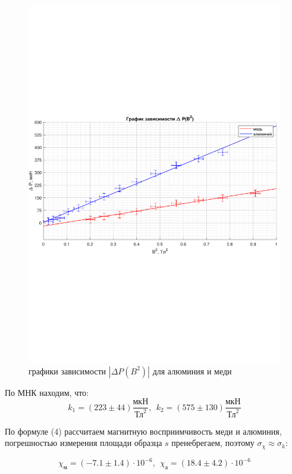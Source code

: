 \documentclass[a4paper,14pt]{article}
\begin{document}
\begin{center}
	\begin{figure}[bhtp]
		\centering
		\includegraphics[width=1.05\linewidth]{gr2.pdf}
		\caption{графики зависимости $|\Delta P(B^2)|$ для алюминия и меди}\label{gra2}
	\end{figure}
\end{center}

По МНК находим, что: \[k_1 = (223 \pm 44)\dfrac{\text{мкН}}{\text{Тл}^2}, \ \ k_2 = (575 \pm 130)\dfrac{\text{мкН}}{\text{Тл}^2}\]


По формуле (4) рассчитаем магнитную восприимчивость меди и алюминия, погрешностью измерения площади образца $s$ пренебрегаем, поэтому $\sigma_\chi \approx \sigma_k$:

\[\chi_{\text{м}} = (-7.1 \pm 1.4) \cdot 10^{-6}, \ \  \chi_{\text{а}} = (18.4 \pm 4.2) \cdot 10^{-6}\]
\end{document}
